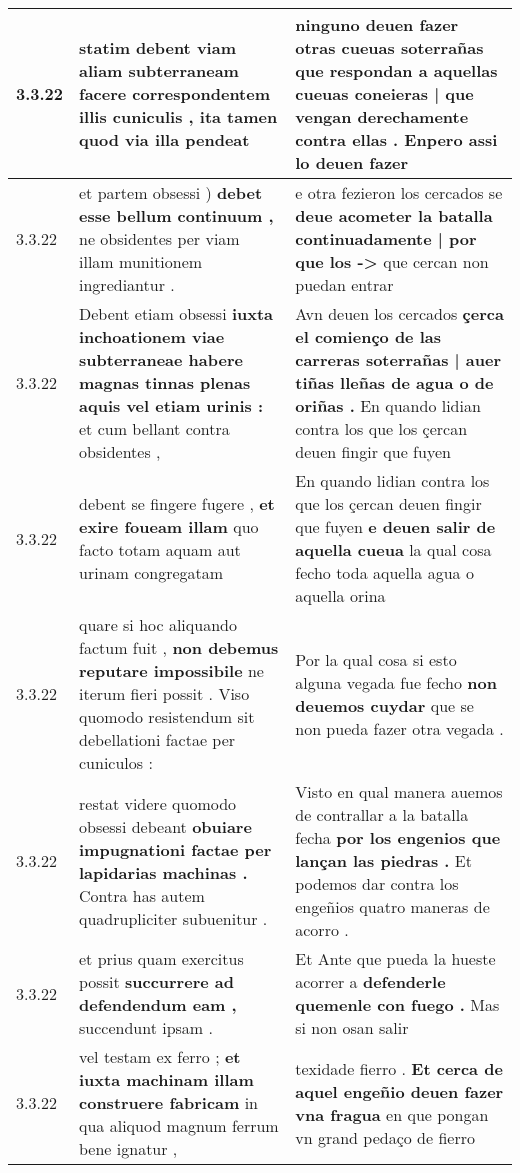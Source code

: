 \begin{tabular}{|p{1cm}|p{6.5cm}|p{6.5cm}|}
3.3.22 & statim debent viam aliam subterraneam \textbf{ facere correspondentem illis cuniculis , } ita tamen quod via illa pendeat & ninguno deuen fazer otras cueuas soterrañas \textbf{ que respondan a aquellas cueuas coneieras | que vengan derechamente contra ellas . } Enpero assi lo deuen fazer \\\hline
3.3.22 & et partem obsessi ) \textbf{ debet esse bellum continuum , } ne obsidentes per viam illam munitionem ingrediantur . & e otra fezieron los cercados se \textbf{ deue acometer la batalla continuadamente | por que los -\-> } que cercan non puedan entrar \\\hline
3.3.22 & Debent etiam obsessi \textbf{ iuxta inchoationem viae subterraneae habere magnas tinnas plenas aquis vel etiam urinis : } et cum bellant contra obsidentes , & Avn deuen los cercados \textbf{ çerca el comienço de las carreras soterrañas | auer tiñas lleñas de agua o de oriñas . } En quando lidian contra los que los çercan deuen fingir que fuyen \\\hline
3.3.22 & debent se fingere fugere , \textbf{ et exire foueam illam } quo facto totam aquam aut urinam congregatam & En quando lidian contra los que los çercan deuen fingir que fuyen \textbf{ e deuen salir de aquella cueua } la qual cosa fecho toda aquella agua o aquella orina \\\hline
3.3.22 & quare si hoc aliquando factum fuit , \textbf{ non debemus reputare impossibile } ne iterum fieri possit . Viso quomodo resistendum sit debellationi factae per cuniculos : & Por la qual cosa si esto alguna vegada fue fecho \textbf{ non deuemos cuydar } que se non pueda fazer otra vegada . \\\hline
3.3.22 & restat videre quomodo obsessi debeant \textbf{ obuiare impugnationi factae per lapidarias machinas . } Contra has autem quadrupliciter subuenitur . & Visto en qual manera auemos de contrallar a la batalla fecha \textbf{ por los engenios que lançan las piedras . } Et podemos dar contra los engeñios quatro maneras de acorro . \\\hline
3.3.22 & et prius quam exercitus possit \textbf{ succurrere ad defendendum eam , } succendunt ipsam . & Et Ante que pueda la hueste acorrer a \textbf{ defenderle quemenle con fuego . } Mas si non osan salir \\\hline
3.3.22 & vel testam ex ferro ; \textbf{ et iuxta machinam illam construere fabricam } in qua aliquod magnum ferrum bene ignatur , & texidade fierro . \textbf{ Et cerca de aquel engeñio deuen fazer vna fragua } en que pongan vn grand pedaço de fierro \\\hline

\end{tabular}
